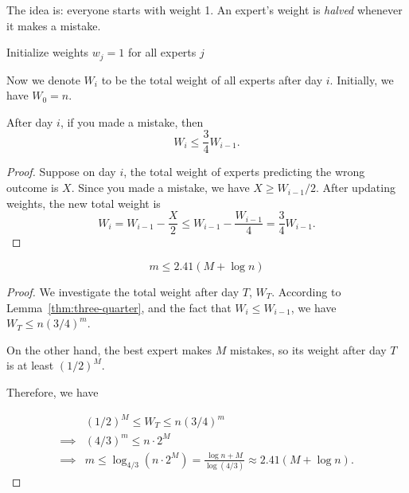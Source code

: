 The idea is: everyone starts with weight 1. An expert's weight is \textit{halved} whenever it makes a mistake.

\begin{algorithm}
	\caption{Halving MWU Algorithm}
	\label{alg:halving-weights}
	Initialize weights $w_j = 1$ for all experts $j$\;
\end{algorithm}

Now we denote $W_i$ to be the total weight of all experts after day $i$. Initially, we have $W_0 = n$.

\begin{lemma}\label{thm:three-quarter}
	After day $i$, if you made a mistake, then
	\[ W_i \leq \frac{3}{4} W_{i-1}. \]
\end{lemma}
\begin{proof}
	Suppose on day $i$, the total weight of experts predicting the wrong outcome is $X$. Since you made a mistake, we have $X \geq W_{i-1}/2$. After updating weights, the new total weight is
	\[ W_i = W_{i-1} - \frac{X}{2} \leq W_{i-1} - \frac{W_{i-1}}{4} = \frac{3}{4} W_{i-1}. \]
\end{proof}

\begin{theorem}
	\[ m \leq 2.41 (M + \log n) \]
\end{theorem}
\begin{proof}
	We investigate the total weight after day $T$, $W_T$. According to Lemma~\ref{thm:three-quarter}, and the fact that $W_i \leq W_{i-1}$, we have $W_T \leq n (3/4)^m$.

	On the other hand, the best expert makes $M$ mistakes, so its weight after day $T$ is at least $(1/2)^M$.

	Therefore, we have

	\begin{align*}
		         & (1/2)^M \leq W_T \leq n (3/4)^m                                                           \\
		\implies & (4/3)^m \leq n \cdot 2^M                                                                  \\
		\implies & m \leq \log_{4/3} (n \cdot 2^M) = \frac{\log n + M}{\log(4/3)} \approx 2.41 (M + \log n).
	\end{align*}
\end{proof}

